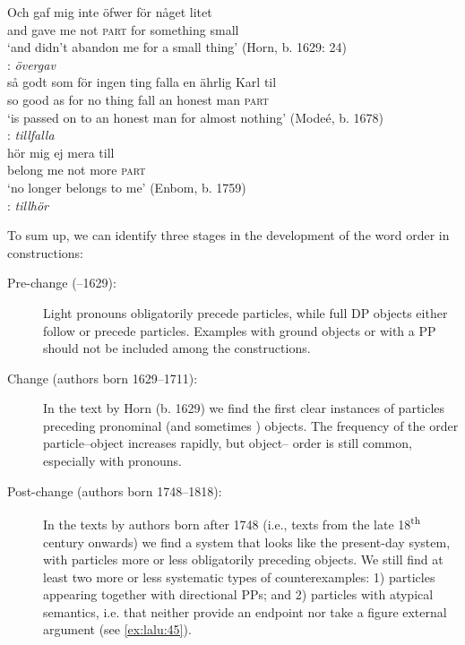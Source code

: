 \documentclass[output=paper]{langscibook}
\begin{document}
\ea\label{ex:lalu:45}
\ea\label{ex:lalu:45a}
\gll  Och   gaf   mig     inte     öfwer   för     någet       litet\\
    and     gave  me   not   \textsc{part}     for     something   small\\
\glt `and didn’t abandon me for a small thing’ (Horn, b. 1629: 24)\\
    : \textit{övergav}\\

\ex\label{ex:lalu:45b}
\gll  så    godt   som   för   ingen ting   falla   en  ährlig   Karl   til \\
    so     good   as     for   no thing     fall   an  honest   man   \textsc{part}\\
\glt ‘is passed on to an honest man for almost nothing’ (Modeé, b. 1678)\\
    : \textit{tillfalla} \\
\ex\label{ex:lalu:45c}
\gll hör       mig   ej     mera   till \\
    belong   me   not   more   \textsc{part}\\
\glt `no longer belongs to me’ (Enbom, b. 1759)\\
    : \textit{tillhör}\\
\z
\z


To sum up, we can identify three stages in the development of the  word order in  constructions:


\begin{description}
\item[Pre-change (–1629):] Light pronouns obligatorily precede particles, while full DP objects either follow or precede particles. Examples with ground objects or with a PP should not be included among the  constructions.
\item[Change (authors born 1629–1711):] In the text by Horn (b. 1629) we find the first clear instances of particles preceding pronominal (and sometimes ) objects. The frequency of the order particle--object increases rapidly, but object– order is still common, especially with pronouns.
\item[Post-change (authors born 1748–1818):] In the texts by authors born after 1748 (i.e., texts from the late 18\textsuperscript{th} century onwards) we find a system that looks like the present-day  system, with particles more or less obligatorily preceding objects. We still find at least two more or less systematic types of counterexamples: 1) particles appearing together with directional PPs; and 2) particles with atypical semantics, i.e. that neither provide an endpoint nor take a figure external argument (see \ref{ex:lalu:45}).
\end{description}
\end{document}
